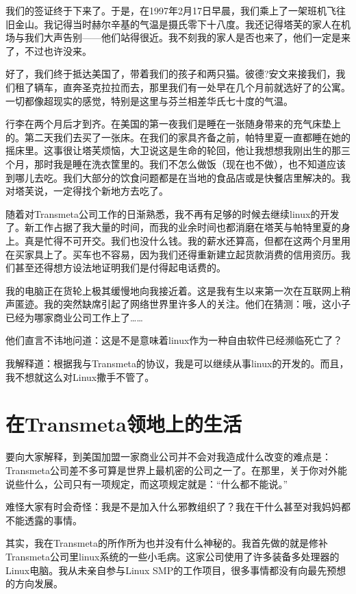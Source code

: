 我们的签证终于下来了。于是，在1997年2月17日早晨，我们乘上了一架班机飞往旧金山。我记得当时赫尔辛基的气温是摄氏零下十八度。我还记得塔芙的家人在机场与我们大声告别——他们站得很近。我不刻我的家人是否也来了，他们一定是来了，不过也许没来。

好了，我们终于抵达美国了，带着我们的孩子和两只猫。彼德?安文来接我们，我们租了辆车，直奔圣克拉拉而去，那里我们有一处早在几个月前就选好了的公寓。一切都像超现实的感觉，特别是这里与芬兰相差华氏七十度的气温。

行李在两个月后才到齐。在美国的第一夜我们是睡在一张随身带来的充气床垫上的。第二天我们去买了一张床。在我们的家具齐备之前，帕特里夏一直都睡在她的摇床里。这事很让塔芙烦恼，大卫说这是生命的轮回，他让我想想我刚出生的那三个月，那时我是睡在洗衣筐里的。我们不怎么做饭（现在也不做），也不知道应该到哪儿去吃。我们大部分的饮食问题都是在当地的食品店或是快餐店里解决的。我对塔芙说，一定得找个新地方去吃了。

随着对Transmeta公司工作的日渐熟悉，我不再有足够的时候去继续linux的开发了。新工作占据了我大量的时间，而我的业余时间也都消磨在塔芙与帕特里夏的身上。真是忙得不可开交。我们也没什么钱。我的薪水还算高，但都在这两个月里用在买家具上了。买车也不容易，因为我们还得重新建立起货款消费的信用资历。我们甚至还得想方设法地证明我们是付得起电话费的。

我的电脑正在货轮上极其缓慢地向我接近着。这是我有生以来第一次在互联网上稍声匿迹。我的突然缺席引起了网络世界里许多人的关注。他们在猜测：哦，这小子已经为哪家商业公司工作上了……

他们直言不讳地问道：这是不是意味着linux作为一种自由软件已经濒临死亡了？

我解释道：根据我与Transmeta的协议，我是可以继续从事linux的开发的。而且，我不想就这么对Linux撒手不管了。

 
\section{在Transmeta领地上的生活}

要向大家解释，到美国加盟一家商业公司并不会对我造成什么改变的难点是：Transmeta公司差不多可算是世界上最机密的公司之一了。在那里，关于你对外能说些什么，公司只有一项规定，而这项规定就是：“什么都不能说。”

难怪大家有时会奇怪：我是不是加入什么邪教组织了？我在干什么甚至对我妈妈都不能透露的事情。

其实，我在Transmeta的所作所为也并没有什么神秘的。我首先做的就是修补Transmeta公司里linux系统的一些小毛病。这家公司使用了许多装备多处理器的Linux电脑。我从未亲自参与Linux SMP的工作项目，很多事情都没有向最先预想的方向发展。

